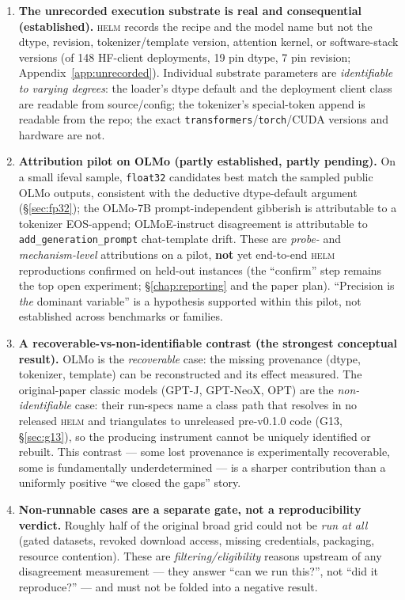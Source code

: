 \documentclass[11pt]{report}
\newcommand{\code}[1]{\texttt{#1}}
\begin{document}
\begin{enumerate}
  \item \textbf{The unrecorded execution substrate is real and consequential
        (established).} \textsc{helm} records the recipe and the model name but not
        the dtype, revision, tokenizer/template version, attention kernel, or
        software-stack versions (of 148 HF-client deployments, 19 pin dtype, 7 pin
        revision; Appendix~\ref{app:unrecorded}). Individual substrate parameters are
        \emph{identifiable to varying degrees}: the loader's dtype default and the
        deployment client class are readable from source/config; the tokenizer's
        special-token append is readable from the repo; the exact
        \code{transformers}/\code{torch}/CUDA versions and hardware are not.
  \item \textbf{Attribution pilot on OLMo (partly established, partly pending).} On a
        small ifeval sample, \code{float32} candidates best match the sampled public
        OLMo outputs, consistent with the deductive dtype-default argument
        (\S\ref{sec:fp32}); the OLMo-7B prompt-independent gibberish is attributable
        to a tokenizer EOS-append; OLMoE-instruct disagreement is attributable to
        \code{add\_generation\_prompt} chat-template drift. These are \emph{probe-} and
        \emph{mechanism-level} attributions on a pilot, \textbf{not} yet end-to-end
        \textsc{helm} reproductions confirmed on held-out instances (the ``confirm''
        step remains the top open experiment; \S\ref{chap:reporting} and the paper
        plan). ``Precision is \emph{the} dominant variable'' is a hypothesis
        supported within this pilot, not established across benchmarks or families.
  \item \textbf{A recoverable-vs-non-identifiable contrast (the strongest conceptual
        result).} OLMo is the \emph{recoverable} case: the missing provenance (dtype,
        tokenizer, template) can be reconstructed and its effect measured. The
        original-paper classic models (GPT-J, GPT-NeoX, OPT) are the
        \emph{non-identifiable} case: their run-specs name a class path that resolves
        in no released \textsc{helm} and triangulates to unreleased pre-v0.1.0 code
        (G13, \S\ref{sec:g13}), so the producing instrument cannot be uniquely
        identified or rebuilt. This contrast --- some lost provenance is
        experimentally recoverable, some is fundamentally underdetermined --- is a
        sharper contribution than a uniformly positive ``we closed the gaps'' story.
  \item \textbf{Non-runnable cases are a separate gate, not a reproducibility
        verdict.} Roughly half of the original broad grid could not be \emph{run at
        all} (gated datasets, revoked download access, missing credentials, packaging,
        resource contention). These are \emph{filtering/eligibility} reasons upstream
        of any disagreement measurement --- they answer ``can we run this?'', not
        ``did it reproduce?'' --- and must not be folded into a negative result.
\end{enumerate}
\end{document}
